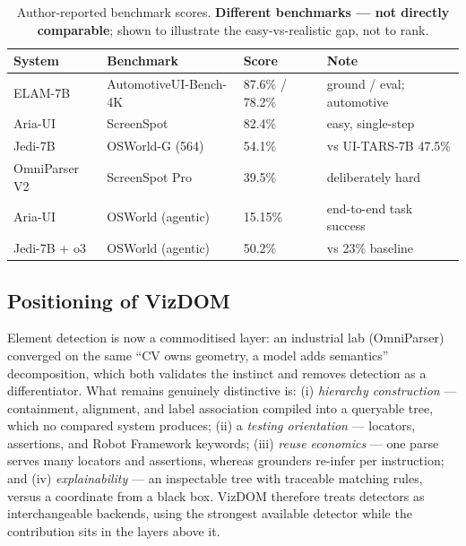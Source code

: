 \documentclass[11pt,a4paper]{article}
\begin{document}
\begin{table}[H]
  \centering\footnotesize
  \caption{Author-reported benchmark scores. \textbf{Different benchmarks --- not
  directly comparable}; shown to illustrate the easy-vs-realistic gap, not to rank.}
  \label{tab:bench}
  \begin{tabular}{@{}p{3.0cm}p{4.4cm}p{3.0cm}p{3.2cm}@{}}
    \toprule
    System & Benchmark & Score & Note \\
    \midrule
    ELAM-7B & AutomotiveUI-Bench-4K & 87.6\% / 78.2\% & ground / eval; automotive \\
    Aria-UI & ScreenSpot & 82.4\% & easy, single-step \\
    Jedi-7B & OSWorld-G (564) & 54.1\% & vs UI-TARS-7B 47.5\% \\
    OmniParser V2 & ScreenSpot Pro & 39.5\% & deliberately hard \\
    Aria-UI & OSWorld (agentic) & 15.15\% & end-to-end task success \\
    Jedi-7B + o3 & OSWorld (agentic) & 50.2\% & vs 23\% baseline \\
    \bottomrule
  \end{tabular}
\end{table}

\subsection{Positioning of VizDOM}
Element detection is now a commoditised layer: an industrial lab (OmniParser)
converged on the same ``CV owns geometry, a model adds semantics'' decomposition,
which both validates the instinct and removes detection as a differentiator. What
remains genuinely distinctive is: (i) \emph{hierarchy construction} --- containment,
alignment, and label association compiled into a queryable tree, which no compared
system produces; (ii) a \emph{testing orientation} --- locators, assertions, and
Robot Framework keywords; (iii) \emph{reuse economics} --- one parse serves many
locators and assertions, whereas grounders re-infer per instruction; and
(iv) \emph{explainability} --- an inspectable tree with traceable matching rules,
versus a coordinate from a black box. VizDOM therefore treats detectors as
interchangeable backends, using the strongest available detector while the
contribution sits in the layers above it.
\end{document}

